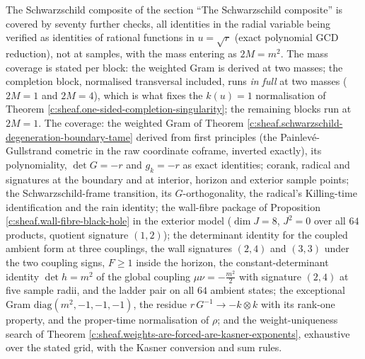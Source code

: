 \documentclass[11pt]{article}
\theoremstyle{definition}
\theoremstyle{plain}
\begin{document}
The Schwarzschild composite of the section ``The Schwarzschild composite'' is covered by seventy further checks, all identities in the radial variable being verified as identities of rational functions in $u = \sqrt r$ (exact polynomial GCD reduction), not at samples, with the mass entering as $2M = m^2$. The mass coverage is stated per block: the weighted Gram is derived at two masses; the completion block, normalised transversal included, runs \emph{in full} at two masses ($2M = 1$ and $2M = 4$), which is what fixes the $k(u) = 1$ normalisation of Theorem \ref{c:sheaf.one-sided-completion-singularity}; the remaining blocks run at $2M = 1$. The coverage: the weighted Gram of Theorem \ref{c:sheaf.schwarzschild-degeneration-boundary-tame} derived from first principles (the Painlev\'e-Gullstrand cometric in the raw coordinate coframe, inverted exactly), its polynomiality, $\det G = -r$ and $g_k = -r$ as exact identities; corank, radical and signatures at the boundary and at interior, horizon and exterior sample points; the Schwarzschild-frame transition, its $G$-orthogonality, the radical's Killing-time identification and the rain identity; the wall-fibre package of Proposition \ref{c:sheaf.wall-fibre-black-hole} in the exterior model ($\dim J = 8$, $J^2 = 0$ over all $64$ products, quotient signature $(1,2)$); the determinant identity for the coupled ambient form at three couplings, the wall signatures $(2,4)$ and $(3,3)$ under the two coupling signs, $F \geq 1$ inside the horizon, the constant-determinant identity $\det h = m^2$ of the global coupling $\mu\nu = -\tfrac{m^2}{2}$ with signature $(2,4)$ at five sample radii, and the ladder pair on all $64$ ambient states; the exceptional Gram $\mathrm{diag}(m^2,-1,-1,-1)$, the residue $r\,G^{-1} \to -k \otimes k$ with its rank-one property, and the proper-time normalisation of $\rho$; and the weight-uniqueness search of Theorem \ref{c:sheaf.weights-are-forced-are-kasner-exponents}, exhaustive over the stated grid, with the Kasner conversion and sum rules.
\end{document}
